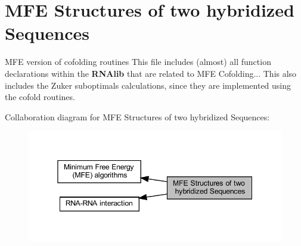 \hypertarget{group__mfe__cofold}{}\section{M\+FE Structures of two hybridized Sequences}
\label{group__mfe__cofold}


M\+FE version of cofolding routines This file includes (almost) all function declarations within the {\bfseries R\+N\+Alib} that are related to M\+FE Cofolding... This also includes the Zuker suboptimals calculations, since they are implemented using the cofold routines.  


Collaboration diagram for M\+FE Structures of two hybridized Sequences\+:
\nopagebreak
\begin{figure}[H]
\begin{center}
\leavevmode
\includegraphics[width=345pt]{group__mfe__cofold}
\end{center}
\end{figure}
